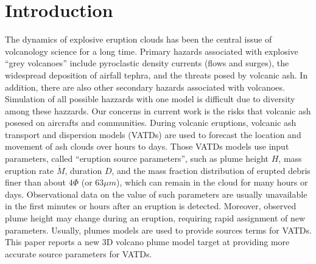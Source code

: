 \documentclass[10pt,a4paper]{article}
\begin{document}
\section{Introduction}
The dynamics of explosive eruption clouds has been the central issue of volcanology science for a long time.
Primary hazards associated with explosive “grey volcanoes” include pyroclastic density currents (flows and surges), the widespread deposition of airfall tephra, and the threats posed by volcanic ash. In addition, there are also other secondary hazards associated with volcanoes\citep{lockwood2013volcanoes}.
Simulation of all possible hazzards with one model is difficult due to diversity among these hazzards. Our concerns in current work is the risks that volcanic ash posesed on aircrafts and communities. During volcanic eruptions, volcanic ash transport and dispersion models (VATDs) are used to forecast the location and movement of ash clouds over hours to days. Those VATDs models use input parameters, called “eruption source parameters”, such as plume height $H$, mass eruption rate $\dot{M}$, duration $D$, and the mass fraction distribution of erupted debris finer than about $4 \Phi$ (or $63  \mu m$), which can remain in the cloud for many hours or days. Observational data on the value of such parameters are usually unavailable in the first minutes or hours after an eruption is detected. Moreover, observed plume height may change during an eruption, requiring rapid assignment of new parameters. Usually, plumes models are used to provide sources terms for VATDs. This paper reports a new 3D volcano plume model target at providing more accurate source parameters for VATDs.\\
\end{document}
